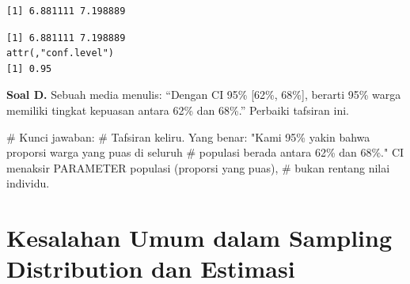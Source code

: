 \documentclass[
  indonesian,
  letterpaper,
]{book}
\newenvironment{Shaded}{\begin{snugshade}}{\end{snugshade}}
\newcommand{\CommentTok}[1]{\textcolor[rgb]{0.37,0.37,0.37}{#1}}
\newcommand{\FunctionTok}[1]{\textcolor[rgb]{0.28,0.35,0.67}{#1}}
\newcommand{\NormalTok}[1]{\textcolor[rgb]{0.00,0.23,0.31}{#1}}
\newcommand{\SpecialCharTok}[1]{\textcolor[rgb]{0.37,0.37,0.37}{#1}}
\begin{document}
\begin{verbatim}
[1] 6.881111 7.198889
\end{verbatim}

\begin{Shaded}
\end{Shaded}

\begin{verbatim}
[1] 6.881111 7.198889
attr(,"conf.level")
[1] 0.95
\end{verbatim}

\textbf{Soal D.} Sebuah media menulis: ``Dengan CI 95\% {[}62\%,
68\%{]}, berarti 95\% warga memiliki tingkat kepuasan antara 62\% dan
68\%.'' Perbaiki tafsiran ini.

\begin{Shaded}
\begin{Highlighting}[]
\CommentTok{\# Kunci jawaban:}
\CommentTok{\# Tafsiran keliru. Yang benar: "Kami 95\% yakin bahwa proporsi warga yang puas di seluruh}
\CommentTok{\# populasi berada antara 62\% dan 68\%." CI menaksir PARAMETER populasi (proporsi yang puas),}
\CommentTok{\# bukan rentang nilai individu.}
\end{Highlighting}
\end{Shaded}

\section{Kesalahan Umum dalam Sampling Distribution dan
Estimasi}\label{kesalahan-umum-dalam-sampling-distribution-dan-estimasi}
\end{document}
